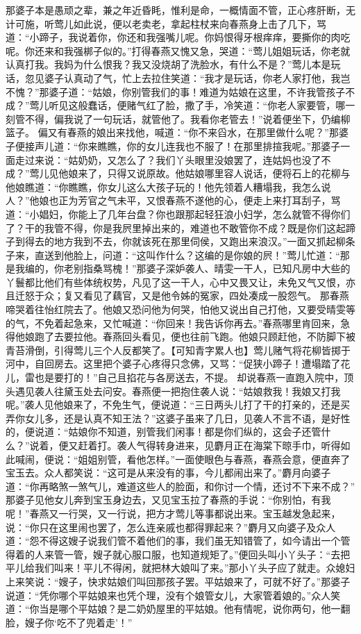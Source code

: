 \documentclass[12pt,oneside]{book}
\begin{document}
那婆子本是愚顽之辈，兼之年近昏眊，惟利是命，一概情面不管，正心疼肝断，无计可施，听莺儿如此说，便以老卖老，拿起柱杖来向春燕身上击了几下，骂道：“小蹄子，我说着你，你还和我强嘴儿呢。你妈恨得牙根痒痒，要撕你的肉吃呢。你还来和我强梆子似的。”打得春燕又愧又急，哭道：“莺儿姐姐玩话，你老就认真打我。我妈为什么恨我？我又没烧胡了洗脸水，有什么不是？”莺儿本是玩话，忽见婆子认真动了气，忙上去拉住笑道：“我才是玩话，你老人家打他，我岂不愧？”那婆子道：“姑娘，你别管我们的事！难道为姑娘在这里，不许我管孩子不成？”莺儿听见这般蠢话，便赌气红了脸，撒了手，冷笑道：“你老人家要管，哪一刻管不得，偏我说了一句玩话，就管他了。我看你老管去！”说着便坐下，仍编柳篮子。
偏又有春燕的娘出来找他，喊道：“你不来舀水，在那里做什么呢？”那婆子便接声儿道：“你来瞧瞧，你的女儿连我也不服了！在那里排揎我呢。”那婆子一面走过来说：“姑奶奶，又怎么了？我们丫头眼里没娘罢了，连姑妈也没了不成？”莺儿见他娘来了，只得又说原故。他姑娘哪里容人说话，便将石上的花柳与他娘瞧道：“你瞧瞧，你女儿这么大孩子玩的！他先领着人糟塌我，我怎么说人？”他娘也正为芳官之气未平，又恨春燕不遂他的心，便走上来打耳刮子，骂道：“小娼妇，你能上了几年台盘？你也跟那起轻狂浪小妇学，怎么就管不得你们了？干的我管不得，你是我屄里掉出来的，难道也不敢管你不成？既是你们这起蹄子到得去的地方我到不去，你就该死在那里伺侯，又跑出来浪汉。”一面又抓起柳条子来，直送到他脸上，问道：“这叫作什么？这编的是你娘的屄！”莺儿忙道：“那是我编的，你老别指桑骂槐！”那婆子深妒袭人、晴雯一干人，已知凡房中大些的丫鬟都比他们有些体统权势，凡见了这一干人，心中又畏又让，未免又气又恨，亦且迁怒于众；复又看见了藕官，又是他令姊的冤家，四处凑成一股怨气。
那春燕啼哭着往怡红院去了。他娘又恐问他为何哭，怕他又说出自己打他，又要受晴雯等的气，不免着起急来，又忙喊道：“你回来！我告诉你再去。”春燕哪里肯回来，急得他娘跑了去要拉他。春燕回头看见，便也往前飞跑。他娘只顾赶他，不防脚下被青苔滑倒，引得莺儿三个人反都笑了。【可知青字累人也】莺儿赌气将花柳皆掷于河中，自回房去。这里把个婆子心疼得只念佛，又骂：“促狭小蹄子！遭塌踏了花儿，雷也是要打的！”自己且掐花与各房送去，不提。
却说春燕一直跑入院中，顶头遇见袭人往黛玉处去问安。春燕便一把抱住袭人说：“姑娘救我！我娘又打我呢。”袭人见他娘来了，不免生气，便说道：“三日两头儿打了干的打亲的，还是买弄你女儿多，还是认真不知王法？”这婆子虽来了几日，见袭人不言不语，是好性的，便说道：“姑娘你不知道，别管我们闲事！都是你们纵的，这会子还管什么？”说着，便又赶着打。袭人气得转身进来，见麝月正在海棠下晾手巾，听得如此喊闹，便说：“姐姐别管，看他怎样。”一面使眼色与春燕，春燕会意，便直奔了宝玉去。众人都笑说：“这可是从来没有的事，今儿都闹出来了。”麝月向婆子道：“你再略煞一煞气儿，难道这些人的脸面，和你讨一个情，还讨不下来不成？”
那婆子见他女儿奔到宝玉身边去，又见宝玉拉了春燕的手说：“你别怕，有我呢！”春燕又一行哭，又一行说，把方才莺儿等事都说出来。宝玉越发急起来，说：“你只在这里闹也罢了，怎么连亲戚也都得罪起来？”麝月又向婆子及众人道：“怨不得这嫂子说我们管不着他们的事，我们虽无知错管了，如今请出一个管得着的人来管一管，嫂子就心服口服，也知道规矩了。”便回头叫小丫头子：“去把平儿给我们叫来！平儿不得闲，就把林大娘叫了来。”那小丫头子应了就走。众媳妇上来笑说：“嫂子，快求姑娘们叫回那孩子罢。平姑娘来了，可就不好了。”那婆子说道：“凭你哪个平姑娘来也凭个理，没有个娘管女儿，大家管着娘的。”众人笑道：“你当是哪个平姑娘？是二奶奶屋里的平姑娘。他有情呢，说你两句，他一翻脸，嫂子你‘吃不了兜着走’！”
\end{document}

